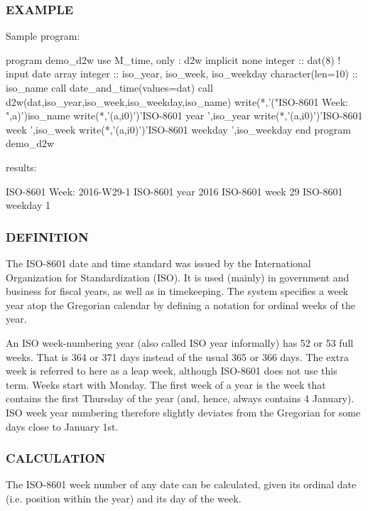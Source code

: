 \subsubsection*{E\+X\+A\+M\+P\+LE}

\begin{DoxyVerb}Sample program:

 program demo_d2w
 use M_time, only : d2w
 implicit none
 integer           :: dat(8)     ! input date array
 integer           :: iso_year, iso_week, iso_weekday
 character(len=10) :: iso_name
    call date_and_time(values=dat)
    call d2w(dat,iso_year,iso_week,iso_weekday,iso_name)
    write(*,'("ISO-8601 Week:   ",a)')iso_name
    write(*,'(a,i0)')'ISO-8601 year    ',iso_year
    write(*,'(a,i0)')'ISO-8601 week    ',iso_week
    write(*,'(a,i0)')'ISO-8601 weekday ',iso_weekday
 end program demo_d2w

results:

 ISO-8601 Week:   2016-W29-1
 ISO-8601 year    2016
 ISO-8601 week    29
 ISO-8601 weekday 1
\end{DoxyVerb}


\subsubsection*{D\+E\+F\+I\+N\+I\+T\+I\+ON}

The I\+S\+O-\/8601 date and time standard was issued by the International Organization for Standardization (I\+SO). It is used (mainly) in government and business for fiscal years, as well as in timekeeping. The system specifies a week year atop the Gregorian calendar by defining a notation for ordinal weeks of the year.

An I\+SO week-\/numbering year (also called I\+SO year informally) has 52 or 53 full weeks. That is 364 or 371 days instead of the usual 365 or 366 days. The extra week is referred to here as a leap week, although I\+S\+O-\/8601 does not use this term. Weeks start with Monday. The first week of a year is the week that contains the first Thursday of the year (and, hence, always contains 4 January). I\+SO week year numbering therefore slightly deviates from the Gregorian for some days close to January 1st.

\subsubsection*{C\+A\+L\+C\+U\+L\+A\+T\+I\+ON}

The I\+S\+O-\/8601 week number of any date can be calculated, given its ordinal date (i.\+e. position within the year) and its day of the week.

